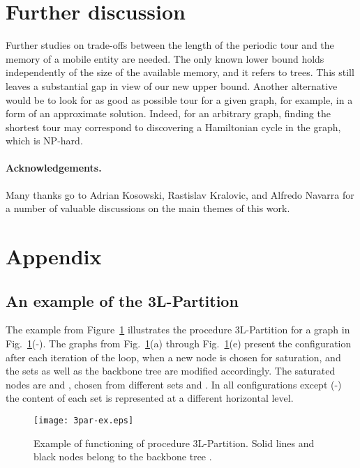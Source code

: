 \documentclass[11pt,envcountsame,oribibl]{llncs}
\begin{document}
\section{Further discussion}
\label{s:conclusion}
Further studies on trade-offs between the length of the periodic tour and
the memory of a mobile entity are needed.
The only known lower bound  holds independently of the size of the
available memory, and it refers to trees.
This still leaves a substantial gap in view of our new  upper bound.
Another alternative would be to look for as good as possible tour
for a given graph, for example, in a form of an approximate solution. Indeed,
for an arbitrary graph, finding the shortest tour may correspond to
discovering a Hamiltonian
cycle in the graph, which is NP-hard.

\paragraph{Acknowledgements.}
Many thanks go to Adrian Kosowski, Rastislav Kralovic, and Alfredo Navarra
for a number of valuable discussions on the main themes of this work.




\nocite{}







\section{Appendix}

\subsection{An example of the 3L-Partition}
The example from Figure~\ref{fig:3par-ex} illustrates the procedure
{\sc 3L-Partition} for a graph in Fig.~\ref{fig:3par-ex}(-). The graphs
from Fig.~\ref{fig:3par-ex}(a) through Fig.~\ref{fig:3par-ex}(e) present
the configuration after
each iteration of the loop, when a new node is chosen for saturation,
and the sets  as well as the backbone tree  are
modified accordingly. The saturated
nodes are  and , chosen from different sets  and .
In all configurations except (-) the content of each set  is
represented at a different horizontal level.

\begin{figure}[htb] \centering
   \texttt{[image: 3par-ex.eps]}
   \caption{Example of functioning of procedure {\sc 3L-Partition}.
   Solid lines and black nodes belong to the backbone tree .}
   \label{fig:3par-ex}
\end{figure}
\end{document}
